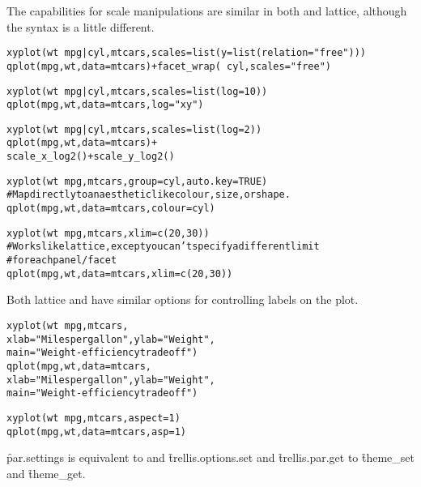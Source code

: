 The capabilities for scale manipulations are similar in both \ggplot and lattice, although the syntax is a little different.

\begin{alltt}
xyplot(wt ~ mpg | cyl, mtcars, scales = list(y = list(relation = "free")))
qplot(mpg, wt, data = mtcars) + facet_wrap(~ cyl, scales = "free")

xyplot(wt ~ mpg | cyl, mtcars, scales = list(log = 10))
qplot(mpg, wt, data = mtcars, log = "xy") 

xyplot(wt ~ mpg | cyl, mtcars, scales = list(log = 2))
qplot(mpg, wt, data = mtcars) + 
  scale_x_log2() + scale_y_log2()

xyplot(wt ~ mpg, mtcars, group = cyl, auto.key = TRUE)
# Map directly to an aesthetic like colour, size, or shape.
qplot(mpg, wt, data = mtcars, colour = cyl)

xyplot(wt ~ mpg, mtcars, xlim = c(20,30))
# Works like lattice, except you can't specify a different limit 
# for each panel/facet
qplot(mpg, wt, data = mtcars, xlim = c(20,30))
\end{alltt}

Both lattice and \ggplot have similar options for controlling labels on the plot.

\begin{alltt}
xyplot(wt ~ mpg, mtcars, 
  xlab = "Miles per gallon", ylab = "Weight", 
  main = "Weight-efficiency tradeoff")
qplot(mpg, wt, data = mtcars, 
  xlab = "Miles per gallon", ylab = "Weight", 
  main = "Weight-efficiency tradeoff")

xyplot(wt ~ mpg, mtcars, aspect = 1) 
qplot(mpg, wt, data = mtcars, asp = 1)
\end{alltt}

\f{par.settings} is equivalent to  and \f{trellis.options.set} and \f{trellis.par.get} to \f{theme_set} and \f{theme_get}.

% 
% 
% 
% 
% 
% 
% 

